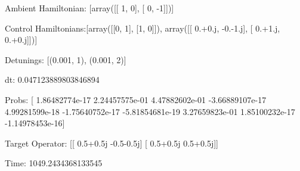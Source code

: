 \documentclass{article}
\begin{document}
    

\newpage

Ambient Hamiltonian: [array([[ 1,  0],
       [ 0, -1]])]

Control Hamiltonians:[array([[0, 1],
       [1, 0]]), array([[ 0.+0.j, -0.-1.j],
       [ 0.+1.j,  0.+0.j]])]

Detunings: [(0.001, 1), (0.001, 2)]

 dt: 0.047123889803846894

Probs: [  1.86482774e-17   2.24457575e-01   4.47882602e-01  -3.66889107e-17
   4.99281599e-18  -1.75640752e-17  -5.81854681e-19   3.27659823e-01
   1.85100232e-17  -1.14978453e-16]

Target Operator: [[ 0.5+0.5j -0.5-0.5j]
 [ 0.5+0.5j  0.5+0.5j]]

Time: 1049.2434368133545
\end{document}
